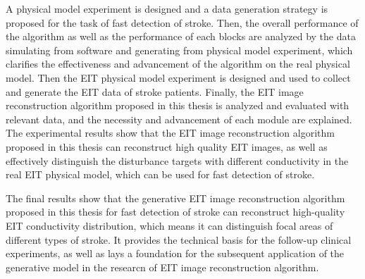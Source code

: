 \begin{englishabstract}
    A physical model experiment is designed and a data generation strategy is proposed for the task of fast detection of stroke.
    Then, the overall performance of the algorithm as well as the performance of each blocks are analyzed by the data simulating from software and generating from physical model experiment, 
    which clarifies the effectiveness and advancement of the algorithm on the real physical model.
    Then the EIT physical model experiment is designed and used to collect and generate the EIT data of stroke patients. 
    Finally, the EIT image reconstruction algorithm proposed in this thesis is analyzed and evaluated with relevant data, 
    and the necessity and advancement of each module are explained. 
    The experimental results show that the EIT image reconstruction algorithm proposed in this thesis can reconstruct high quality EIT images,
    as well as effectively distinguish the disturbance targets with different conductivity in the real EIT physical model, which can be used for fast detection of stroke.

    The final results show that the generative EIT image reconstruction algorithm proposed in this thesis for 
    fast detection of stroke can reconstruct high-quality EIT conductivity distribution, which means it can distinguish focal areas of different types of stroke.
    It provides the technical basis for the follow-up clinical experiments, as well as lays a foundation for the subsequent application of the generative model in the researcn of EIT image reconstruction algorithm.





\end{englishabstract}